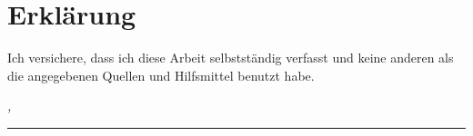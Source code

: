 %
\chapter*{Erklärung}
\label{sec:declaration}
\thispagestyle{empty}

Ich versichere, dass ich diese Arbeit selbstständig verfasst und keine anderen als die angegebenen Quellen und Hilfsmittel benutzt habe.
\bigskip

\noindent\textit{\thesisUniversityCity, \thesisDate}

\smallskip

\begin{flushright}
	\begin{minipage}{5cm}
		\rule{\textwidth}{1pt}
		\centering\thesisName
	\end{minipage}
\end{flushright}


